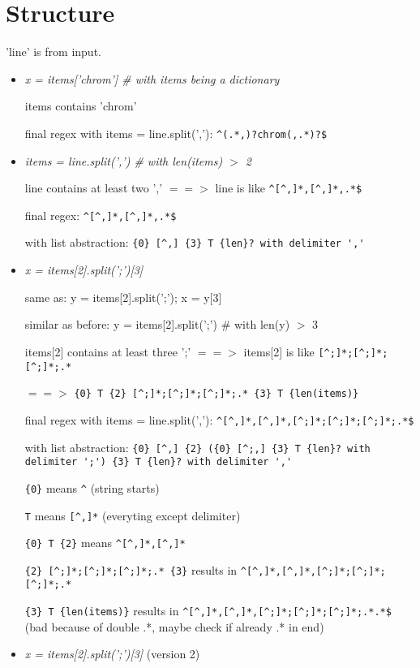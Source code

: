 \documentclass[11pt]{article}
\begin{document}
\section{Structure}

'line' is from input.

\begin{itemize}

\item \textit{x = items['chrom'] \# with items being a dictionary}

items contains 'chrom'

final regex with items = line.split(','): \verb|^(.*,)?chrom(,.*)?$|


\item \textit{items = line.split(',') \# with len(items) $>$ 2}

line contains at least two ',' $==>$ line is like \verb|^[^,]*,[^,]*,.*$|

final regex: \verb|^[^,]*,[^,]*,.*$|

with list abstraction: \verb|{0} [^,] {3} T {len}? with delimiter ','|


\item \textit{x = items[2].split(';')[3]}

same as: y = items[2].split(';'); x = y[3]

similar as before: y = items[2].split(';') \# with len(y) $>$ 3

items[2] contains at least three ';' $==>$ items[2] is like \verb|[^;]*;[^;]*;[^;]*;.*| 

$==>$ \verb|{0} T {2} [^;]*;[^;]*;[^;]*;.* {3} T {len(items)}|

final regex with items = line.split(','): \verb|^[^,]*,[^,]*,[^;]*;[^;]*;[^;]*;.*$|

with list abstraction: \verb|{0} [^,] {2} ({0} [^;,] {3} T {len}? with delimiter ';') {3} T {len}? with delimiter ','|

\verb|{0}| means \verb|^| (string starts)

\verb|T| means \verb|[^,]*| (everyting except delimiter)

\verb|{0} T {2}| means \verb|^[^,]*,[^,]*|

\verb|{2} [^;]*;[^;]*;[^;]*;.* {3}| results in \verb|^[^,]*,[^,]*,[^;]*;[^;]*;[^;]*;.*|

\verb|{3} T {len(items)}| results in \verb|^[^,]*,[^,]*,[^;]*;[^;]*;[^;]*;.*.*$| (bad because of double .*, maybe check if already .* in end)


\item \textit{x = items[2].split(';')[3]} (version 2)


\end{itemize}
\end{document}
